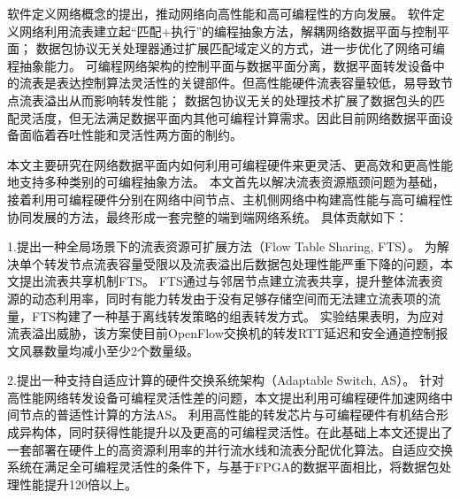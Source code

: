 
\setcounter{page}{1}

%
%
%

软件定义网络概念的提出，推动网络向高性能和高可编程性的方向发展。
软件定义网络利用流表建立起“匹配+执行”的编程抽象方法，解耦网络数据平面与控制平面；
数据包协议无关处理器通过扩展匹配域定义的方式，进一步优化了网络可编程抽象能力。
可编程网络架构的控制平面与数据平面分离，数据平面转发设备中的流表是表达控制算法灵活性的关键部件。但高性能硬件流表容量较低，易导致节点流表溢出从而影响转发性能；
数据包协议无关的处理技术扩展了数据包头的匹配灵活度，但无法满足数据平面内其他可编程计算需求。因此目前网络数据平面设备面临着吞吐性能和灵活性两方面的制约。

本文主要研究在网络数据平面内如何利用可编程硬件来更灵活、更高效和更高性能地支持多种类别的可编程抽象方法。
本文首先以解决流表资源瓶颈问题为基础，接着利用可编程硬件分别在网络中间节点、主机侧网络中构建高性能与高可编程性协同发展的方法，最终形成一套完整的端到端网络系统。
具体贡献如下：

1.提出一种全局场景下的流表资源可扩展方法（Flow Table Sharing, FTS）。
为解决单个转发节点流表容量受限以及流表溢出后数据包处理性能严重下降的问题，本文提出流表共享机制FTS。
FTS通过与邻居节点建立流表共享，提升整体流表资源的动态利用率，同时有能力转发由于没有足够存储空间而无法建立流表项的流量，FTS构建了一种基于离线转发策略的组表转发方式。
实验结果表明，为应对流表溢出威胁，该方案使目前OpenFlow交换机的转发RTT延迟和安全通道控制报文风暴数量均减小至少2个数量级。

2.提出一种支持自适应计算的硬件交换系统架构（Adaptable Switch, AS）。
针对高性能网络转发设备可编程灵活性差的问题，本文提出利用可编程硬件加速网络中间节点的普适性计算的方法AS。
利用高性能的转发芯片与可编程硬件有机结合形成异构体，同时获得性能提升以及更高的可编程灵活性。在此基础上本文还提出了一套部署在硬件上的高资源利用率的并行流水线和流表分配优化算法。自适应交换系统在满足全可编程灵活性的条件下，与基于FPGA的数据平面相比，将数据包处理性能提升120倍以上。

